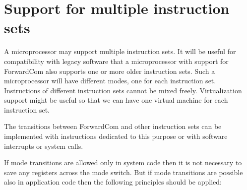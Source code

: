 \documentclass[forwardcom.tex]{subfiles}
\begin{document}
\RaggedRight

\chapter{Support for multiple instruction sets}

A microprocessor may support multiple instruction sets. It will be useful for compatibility with legacy software that a microprocessor with support for ForwardCom also supports one or more older instruction sets. Such a microprocessor will have different modes, one for each instruction set. Instructions of different instruction sets cannot be mixed freely. Virtualization support might be useful so that we can have one virtual machine for each instruction set.
\vv

The transitions between ForwardCom and other instruction sets can be implemented with instructions dedicated to this purpose or with software interrupts or system calls. 
\vv

If mode transitions are allowed only in system code then it is not necessary to save any registers across the mode switch. But if mode transitions are possible also in application code then the following principles should be applied:
\end{document}
